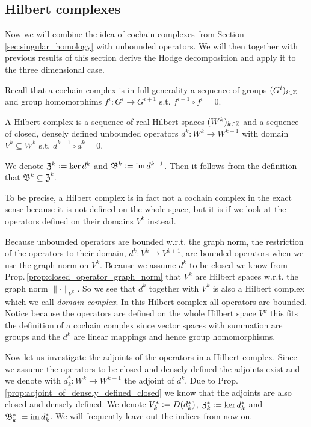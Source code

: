 \documentclass[../master_thesis.tex]{subfiles}
\begin{document}
\subsection{Hilbert complexes}

Now we will combine the idea of cochain complexes from Section 
\ref{sec:singular_homology} 
with unbounded operators. We will then together with previous results of
this section derive the Hodge decomposition and apply it to the three dimensional case.

Recall that a cochain complex 
is in full generality a sequence of groups $(G^i)_{i\in \mathbb{Z}}$ 
and group homomorphims $f^i: G^i \rightarrow G^{i+1}$ s.t. 
$f^{i+1} \circ f^{i} = 0$.

\begin{definition}
    A Hilbert complex is a sequence of real Hilbert spaces $(W^k)_{k\in \mathbb{Z}}$
    and a sequence of closed, densely defined 
    unbounded operators $d^k: W^k \rightarrow W^{k+1}$ with domain
    $V^k \subseteq W^k$ s.t. $d^{k+1} \circ d^k = 0$.
\end{definition}
\noindent We denote $\mathfrak{Z}^k  \vcentcolon= \ker d^k$ and $\mathfrak{B}^k 
\vcentcolon= \operatorname{im} d^{k-1}$. Then it follows from the definition that
$\mathfrak{B}^k \subseteq \mathfrak{Z}^k$. 

To be precise, a Hilbert complex is in fact not a cochain complex in the exact 
sense because it is not defined on the whole space, but it is if we look at
the operators defined on their domains $V^k$ instead.

Because unbounded operators are bounded w.r.t. the graph norm,
the restriction of the operators to their domain,
$d^k: V^k \rightarrow V^{k+1}$, are bounded operators when we use the graph norm
on $V^k$. 
Because we assume $d^k$ to be 
closed we know from Prop.\,\ref{prop:closed_operator_graph_norm}
that $V^k$ are Hilbert spaces w.r.t. the graph norm $\lVert \cdot \rVert _{V^k}$.
So we see that $d^k$ together with $V^k$ is also a Hilbert complex which 
we call \textit{domain complex}. In this Hilbert complex all operators are 
bounded. Notice because the operators are defined on the whole Hilbert space 
$V^k$ this fits the definition of a cochain complex since vector spaces 
with summation
are groups and the $d^k$ are linear mappings and hence group homomorphisms.

Now let us investigate the adjoints of the operators in a Hilbert complex.
Since we assume the operators to be closed and densely defined the adjoints 
exist and we denote with $d_k^*:W^k \rightarrow W^{k-1}$ the adjoint of $d^k$.
Due to Prop.\,\ref{prop:adjoint_of_densely_defined_closed} we know that the 
adjoints are also closed and densely defined. We denote 
$V_k^* \vcentcolon= D(d_k^*)$, $\mathfrak{Z}^*_k \vcentcolon= \ker d^*_k$ 
and $\mathfrak{B}^*_k \vcentcolon= \operatorname{im} d^*_k$. We will frequently leave out 
the indices from now on.
\end{document}
